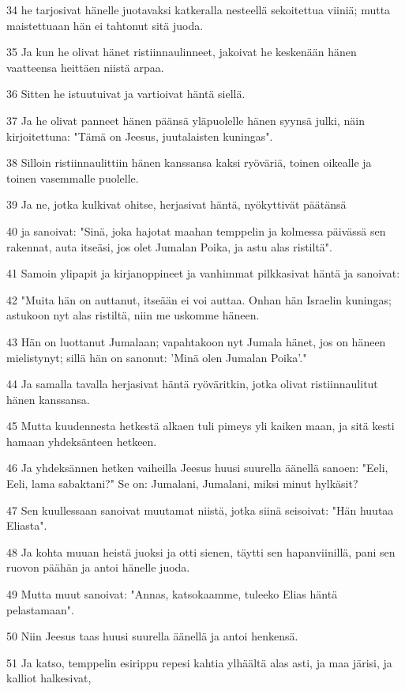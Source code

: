 \par 34 he tarjosivat hänelle juotavaksi katkeralla nesteellä sekoitettua viiniä; mutta maistettuaan hän ei tahtonut sitä juoda.
\par 35 Ja kun he olivat hänet ristiinnaulinneet, jakoivat he keskenään hänen vaatteensa heittäen niistä arpaa.
\par 36 Sitten he istuutuivat ja vartioivat häntä siellä.
\par 37 Ja he olivat panneet hänen päänsä yläpuolelle hänen syynsä julki, näin kirjoitettuna: "Tämä on Jeesus, juutalaisten kuningas".
\par 38 Silloin ristiinnaulittiin hänen kanssansa kaksi ryöväriä, toinen oikealle ja toinen vasemmalle puolelle.
\par 39 Ja ne, jotka kulkivat ohitse, herjasivat häntä, nyökyttivät päätänsä
\par 40 ja sanoivat: "Sinä, joka hajotat maahan temppelin ja kolmessa päivässä sen rakennat, auta itseäsi, jos olet Jumalan Poika, ja astu alas ristiltä".
\par 41 Samoin ylipapit ja kirjanoppineet ja vanhimmat pilkkasivat häntä ja sanoivat:
\par 42 "Muita hän on auttanut, itseään ei voi auttaa. Onhan hän Israelin kuningas; astukoon nyt alas ristiltä, niin me uskomme häneen.
\par 43 Hän on luottanut Jumalaan; vapahtakoon nyt Jumala hänet, jos on häneen mielistynyt; sillä hän on sanonut: 'Minä olen Jumalan Poika'."
\par 44 Ja samalla tavalla herjasivat häntä ryöväritkin, jotka olivat ristiinnaulitut hänen kanssansa.
\par 45 Mutta kuudennesta hetkestä alkaen tuli pimeys yli kaiken maan, ja sitä kesti hamaan yhdeksänteen hetkeen.
\par 46 Ja yhdeksännen hetken vaiheilla Jeesus huusi suurella äänellä sanoen: "Eeli, Eeli, lama sabaktani?" Se on: Jumalani, Jumalani, miksi minut hylkäsit?
\par 47 Sen kuullessaan sanoivat muutamat niistä, jotka siinä seisoivat: "Hän huutaa Eliasta".
\par 48 Ja kohta muuan heistä juoksi ja otti sienen, täytti sen hapanviinillä, pani sen ruovon päähän ja antoi hänelle juoda.
\par 49 Mutta muut sanoivat: "Annas, katsokaamme, tuleeko Elias häntä pelastamaan".
\par 50 Niin Jeesus taas huusi suurella äänellä ja antoi henkensä.
\par 51 Ja katso, temppelin esirippu repesi kahtia ylhäältä alas asti, ja maa järisi, ja kalliot halkesivat,
